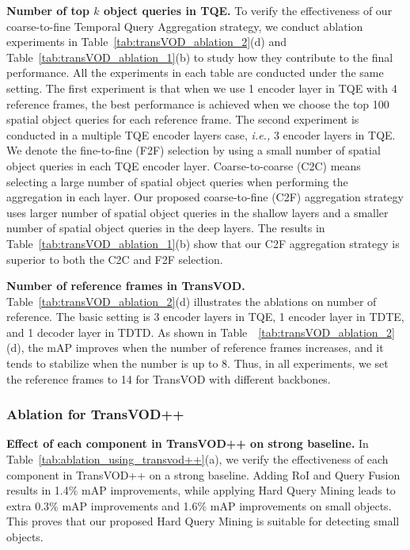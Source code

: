 \documentclass[10pt,journal,compsoc]{IEEEtran}
\begin{document}
\noindent \textbf{Number of top $k$ object queries in TQE.}
To verify the effectiveness of our coarse-to-fine Temporal Query Aggregation strategy, we conduct ablation experiments in Table~\ref{tab:transVOD_ablation_2}(d) and Table~\ref{tab:transVOD_ablation_1}(b) to study how they contribute to the final performance. All the experiments in each table are conducted under the same setting. The first experiment is that when we use 1 encoder layer in TQE with 4 reference frames, the best performance is achieved when we choose the top 100 spatial object queries for each reference frame. The second experiment is conducted in a multiple TQE encoder layers case, \emph{i.e.,} 3 encoder layers in TQE. We denote the fine-to-fine (F2F) selection by using a small number of spatial object queries in each TQE encoder layer. Coarse-to-coarse (C2C)  means selecting a large number of spatial object queries when performing the aggregation in each layer. Our proposed coarse-to-fine (C2F) aggregation strategy uses larger number of spatial object queries in the shallow layers and a smaller number of spatial object queries in the deep layers. The results in Table~\ref{tab:transVOD_ablation_1}(b) show that our C2F aggregation strategy is superior to both the C2C and F2F selection. 

\noindent \textbf{Number of reference frames in TransVOD.} Table~\ref{tab:transVOD_ablation_2}(d) illustrates the ablations on number of reference. The basic setting is 3 encoder layers in TQE, 1 encoder layer in TDTE, and 1 decoder layer in TDTD. As shown in Table~~\ref{tab:transVOD_ablation_2}(d), the mAP improves when the number of reference frames increases, and it tends to stabilize when the number is up to 8. Thus, in all experiments, we set the reference frames to 14 for TransVOD with different backbones.



\subsubsection{Ablation for TransVOD++}

\noindent 
\textbf{Effect of each component in TransVOD++ on strong baseline.} In Table~\ref{tab:ablation_using_transvod++}(a), we verify the effectiveness of each component in TransVOD++ on a strong baseline.
Adding RoI and Query Fusion results in 1.4$\%$ mAP improvements, while applying Hard Query Mining leads to extra 0.3$\%$ mAP improvements and 1.6$\%$ mAP improvements on small objects. This proves that our proposed Hard Query Mining is suitable for detecting small objects.
\end{document}
